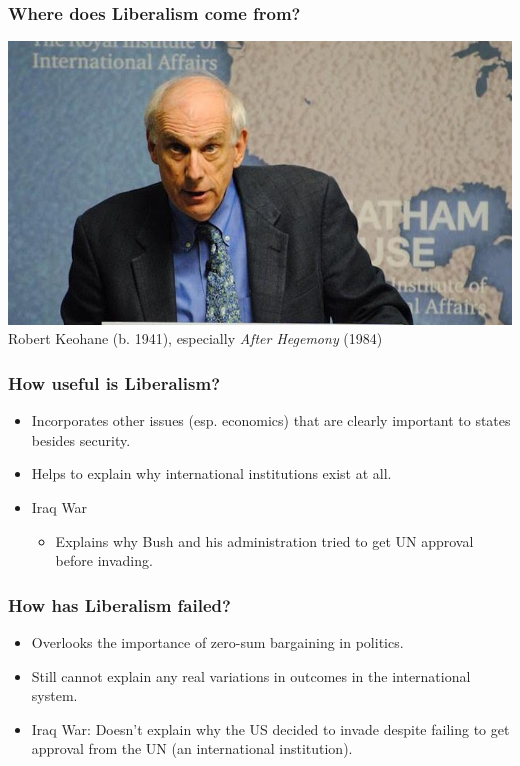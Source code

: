 \documentclass{beamer}
\begin{document}
\begin{frame} 
\frametitle{\LARGE{Where does Liberalism come from?}}
    \centering
\includegraphics[width=\textwidth,height=0.8\textheight,keepaspectratio]{keohane.jpeg}
Robert Keohane (b. 1941), especially \textit{After Hegemony} (1984)
\end{frame}


\begin{frame} 
\frametitle{\LARGE{How useful is Liberalism?}}
    \begin{itemize}
        \item Incorporates other issues (esp. economics) that are clearly important to states besides security. \pause
        \item Helps to explain why international institutions exist at all. \pause
        \item Iraq War \pause 
        \begin{itemize}
            \item Explains why Bush and his administration tried to get UN approval before invading. 
        \end{itemize}
    \end{itemize}
\end{frame}

\begin{frame} 
\frametitle{\LARGE{How has Liberalism failed?}}
\begin{itemize}
    \item Overlooks the importance of zero-sum bargaining in politics. \pause
    \item Still cannot explain any real variations in outcomes in the international system. \pause
    \item Iraq War: \pause Doesn't explain why the US decided to invade despite failing to get approval from the UN (an international institution).
\end{itemize}
\end{frame}
\end{document}
